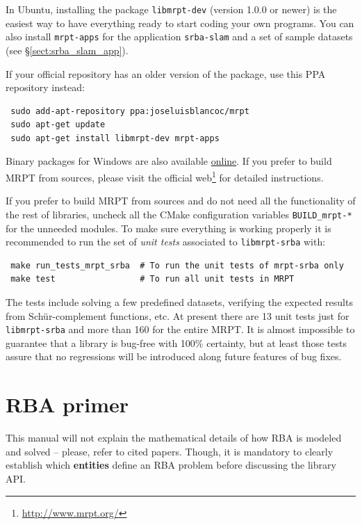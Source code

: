 \documentclass[a4paper,11pt]{article}
\begin{document}
In Ubuntu, installing the package \texttt{libmrpt-dev} (version 1.0.0 or newer) is the easiest way to have 
everything ready to start coding your own programs. You can also install \texttt{mrpt-apps} for the application \texttt{srba-slam} 
and a set of sample datasets (see \S\ref{sect:srba_slam_app}).

If your official repository has an older version of the package, use this PPA repository instead:

\begin{lstlisting}
 sudo add-apt-repository ppa:joseluisblancoc/mrpt
 sudo apt-get update
 sudo apt-get install libmrpt-dev mrpt-apps
\end{lstlisting}

Binary packages for Windows are also available \href{http://www.mrpt.org/download}{online}.
If you prefer to build MRPT from sources, please visit the official web\footnote{\href{http://www.mrpt.org/}{http://www.mrpt.org/}} 
for detailed instructions.

If you prefer to build MRPT from sources and do not need all the functionality of the rest of libraries, 
uncheck all the CMake configuration variables \texttt{BUILD\_mrpt-*} for the unneeded modules. 
To make sure everything is working properly it is recommended to run the set of \emph{unit tests} associated 
to \texttt{libmrpt-srba} with: 

\begin{lstlisting}
 make run_tests_mrpt_srba  # To run the unit tests of mrpt-srba only
 make test                 # To run all unit tests in MRPT
\end{lstlisting}

The tests include solving a few predefined datasets, verifying the expected results from 
Sch\"ur-complement functions, etc. At present there are 13 unit tests just for \texttt{libmrpt-srba}
and more than 160 for the entire MRPT. 
It is almost impossible to guarantee that a library is bug-free with 100\% certainty, 
but at least those tests assure that no regressions will be introduced along future features of bug fixes.


\newpage
\section{RBA primer}
\label{sect:rba_primer}

This manual will not explain the mathematical details of how RBA is modeled and solved -- please, refer to cited papers.
Though, it is mandatory to clearly establish which \textbf{entities} define an RBA problem before discussing the library API.
\end{document}
